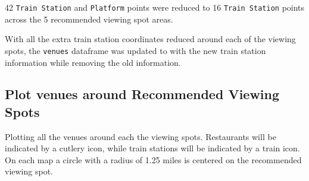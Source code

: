 \documentclass[11pt]{article}
\begin{document}
42 \texttt{Train\ Station} and \texttt{Platform} points were reduced to 16
\texttt{Train\ Station} points across the 5 recommended viewing spot
areas.

With all the extra train station coordinates reduced around each of the
viewing spots, the \texttt{venues} dataframe was updated to with the new
train station information while removing the old information.

    \hypertarget{plot-venues-around-recommended-viewing-spots}{%
\subsection{Plot venues around Recommended Viewing Spots}\label{plot-venues-around-recommended-viewing-spots}}

Plotting all the venues around each the viewing spots. Restaurants will be indicated 
by a cutlery icon, while train stations will be indicated by a train icon. On each map a circle
with a radius of 1.25 miles is centered on the recommended viewing spot.
\end{document}
